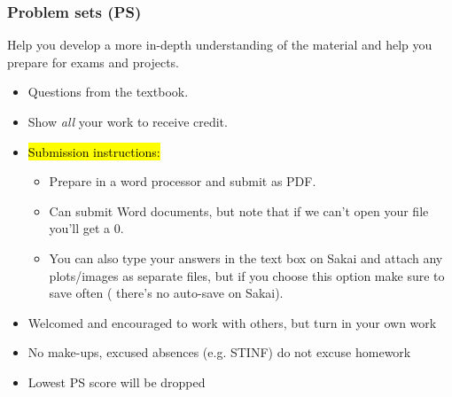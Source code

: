 \documentclass[slidestop,compress,mathserif,12pt,t,professionalfonts,xcolor=table]{beamer}
\begin{document}

\begin{frame}
\frametitle{Problem sets (PS)}

 Help you develop a more in-depth understanding of the material and 
help you prepare for exams and projects.

\begin{itemize}

\item Questions from the textbook.

\item Show \emph{all} your work to receive credit.

\item \hl{Submission instructions:}
\begin{itemize}
\item Prepare in a word processor and submit as PDF.
\item Can submit Word documents, but note that if we can't open your file you'll 
get a 0.
\item You can also type your answers in the text box on Sakai and attach any 
plots/images as separate files, but if you choose this option make sure to save often (
there's no auto-save on Sakai).
\end{itemize}

\item Welcomed and encouraged to work with others, but turn in your own work

\item No make-ups, excused absences (e.g. STINF) do not excuse homework

\item Lowest PS score will be dropped

\end{itemize}


\end{frame}

\end{document}
